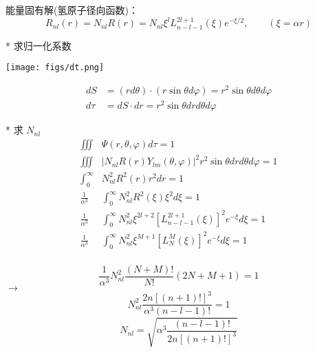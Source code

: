 	能量固有解(氢原子径向函数)：
	\begin{equation*}
		R_{nl} (r) =N_{nl}R(r)=N_{nl} \xi  ^l  L_{n-l-1} ^{2l+1} (\xi) e^{-\xi/2} , \qquad (\xi =\alpha r)
	\end{equation*}	
			


	{* 求归一化系数}
  \begin{center}
	   \texttt{[image: figs/dt.png]}
  \end{center}
$$ \begin{aligned}
  dS&=(rd\theta)\cdot (r\sin \theta d \varphi ) =r^2 \sin \theta d\theta d \varphi \\
  d \tau &=dS \cdot dr = r^2 \sin \theta dr d\theta d \varphi	  
\end{aligned}$$



	* 求 $N_{nl}$ 
	\begin{equation*}
	\begin{split}
		\iiint  &\Psi(r,\theta,\varphi) d \tau =1  \\
		\iiint  &|N_{nl} R (r) Y_{lm} (\theta,\varphi)| ^2 r^2 \sin \theta dr d\theta d\varphi =1  \\
		\int_{0}^{\infty}  & N^2_{nl} R^2  (r)  r^2 dr =1   \\
		\frac{1}{\alpha ^3}	&\int_{0}^{\infty}  N^2_{nl}  R^2 (\xi)  \xi^2 d\xi =1   \\
		\frac{1}{\alpha ^3} &	\int_{0}^{\infty}  N^2_{nl}  \xi ^{2l+2}  [L_{n-l-1} ^{2l+1} (\xi)]^2 e^{-\xi}  d\xi =1   \\
		\frac{1}{\alpha ^3} &	\int_{0}^{\infty}  N^2_{nl}  \xi ^{M+1}  [L_N ^M (\xi)]^2 e^{-\xi}  d\xi =1   \\
	\end{split}		
	\end{equation*}	
		


	\begin{equation*}
		\frac{1}{\alpha ^3} 	  N^2_{nl}  \frac{(N+M)!}{N!} (2N+M+1) =1  	
	\end{equation*}	
	$\to$ \\
	\begin{equation*}
		N^2 _{nl}  \frac{2n [(n+1)!]^3} {\alpha^3 (n-l-1)!} =1
	\end{equation*}	
	\begin{equation*}
		N_{nl}  =\sqrt{\alpha^3 \frac{ (n-l-1)!}{2n [(n+1)!]^3}} 
	\end{equation*}	
		

